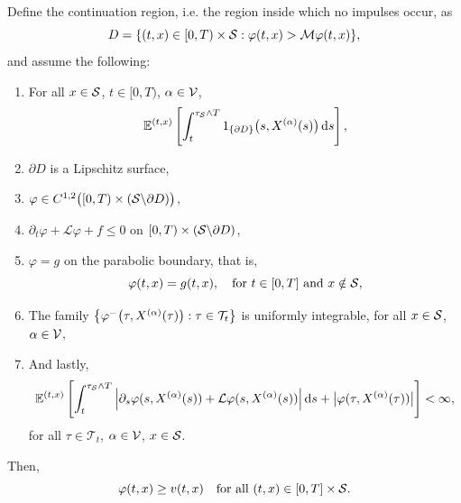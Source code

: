 \begin{theorem}
\begin{enumerate}[label=(\alph*)]
        Define the continuation region, i.e. the region inside which no impulses occur, as
        \begin{equation*}
            D = \{(t,x) \in [0,T) \times \mathcal{S}: \varphi(t,x) > \mathcal{M} \varphi(t,x)\},
        \end{equation*}
        and assume the following:
        \begin{enumerate}[label=(\roman*), start=3]
            \item For all $x \in \mathcal{S}$, $t \in [0,T)$, $\alpha \in \mathcal{V}$,
            \begin{equation*}
                \mathbb{E}^{(t,x)} \left[ \int_t^{\tau_{\mathcal{S}} \wedge T} 1_{\left\{\partial D\right\}}\big(s,X^{(\alpha)}(s)\big) \,\mathrm{d} s\right], 
            \end{equation*}
            \item $\partial D$ is a Lipschitz surface,
            \item $\varphi \in C^{1,2}\big([0,T)\times (\mathcal{S} \backslash \partial D) \big)$,
            \item $\partial_t \varphi + \mathcal L \varphi + f \leq 0$ on $[0,T) \times (\mathcal{S} \backslash \partial D)$,
            \item $\varphi = g$ on the parabolic boundary, that is, 
            \begin{equation*}
                \varphi(t,x) = g(t,x), \quad \text{for } t \in [0,T] \text{ and } x \notin \mathcal{S},
            \end{equation*}
            \item The family $\big\{ \varphi^- \big(\tau,X^{(\alpha)}(\tau)\big): \tau \in \mathcal{T}_t \big\}$ is uniformly integrable, for all $x \in \mathcal{S}$, $\alpha \in \mathcal{V}$,
            \item And lastly, 
            \begin{equation*}
                \mathbb{E}^{(t,x)} \left[ \int_t^{\tau_{\mathcal{S}} \wedge T} \Big|\partial_s \varphi(s,X^{(\alpha)}(s)) + \mathcal{L}\varphi(s,X^{(\alpha)}(s)) \Big| \,\mathrm{d} s + \big| \varphi(\tau,X^{(\alpha)}(\tau)) \big| \right] < \infty,
            \end{equation*}
            for all $\tau \in \mathcal{T}_t$, $\alpha \in \mathcal{V}$, $x \in \mathcal{S}$.
        \end{enumerate}
        Then,
        \begin{equation}
            \varphi(t,x) \geq v(t,x) \quad \text{for all } (t,x) \in [0,T] \times \mathcal{S}.
            \label{eqn: ØS theorem 9.2, first ineq}
        \end{equation}

\end{enumerate}
\end{theorem}
